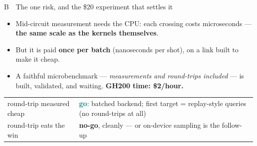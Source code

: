 \documentclass[aspectratio=169,11pt]{beamer}
\newcommand{\punch}[1]{{\color{framerule}\bfseries #1}}
\begin{document}
\begin{frame}{B \,\textperiodcentered\, The one risk, and the \$20 experiment that settles it}
  \begin{itemize}
    \item Mid-circuit measurement needs the CPU: each crossing costs microseconds --- \punch{the same scale as the kernels themselves}.
    \item But it is paid \punch{once per batch} (nanoseconds per shot), on a link built to make it cheap.
    \item A faithful microbenchmark --- \emph{measurements and round-trips included} --- is built, validated, and waiting. \punch{GH200 time: \$2/hour.}
  \end{itemize}
  \centering
  {\small
  \begin{tabular}{@{}p{}p{}@{}}
    \toprule
    round-trip measured cheap & \textcolor{teal}{\textbf{go}}: batched backend; first target = replay-style queries (no round-trips at all) \\
    round-trip eats the win & \textbf{no-go}, cleanly --- or on-device sampling is the follow-up \\
    \bottomrule
  \end{tabular}}
\end{frame}
\end{document}
